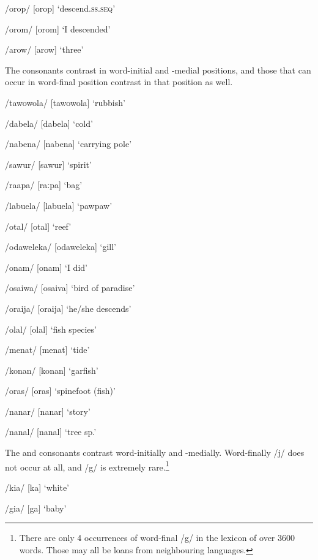 /orop/  [o{{\textprimstress}rop}]  `descend.\textsc{ss.seq}'

/orom/  [o{{\textprimstress}rom}]  `I descended'

/arow/  [a{{\textprimstress}row}]  `three'

The  consonants contrast in word-initial and -medial positions, and those that can occur in word-final position contrast in that position as well.

/tawowola/  [ta{{\textprimstress}wowola}]  `rubbish'

/dabela/  [da{{\textprimstress}bela}]  `cold'

/nabena/  [na{{\textprimstress}bena}]  `carrying pole'

/sawur/  [sa{{\textprimstress}wur}]  `spirit'    

/raapa/  [{{\textprimstress}raːpa}]  `bag'

/labuela/  [la{{\textprimstress}buela}]  `pawpaw'

/otal/  [o{{\textprimstress}tal}]  `reef'

/odaweleka/  [o{{\textprimstress}daweleka}]  `gill'

/onam/  [o{{\textprimstress}nam}]  `I did'

/osaiwa/  [o{{\textprimstress}saiva}]  `bird of paradise'

/oraija/  [o{{\textprimstress}raija}]  `he/she descends'

/olal/  [o{{\textprimstress}lal}]  `fish species'

/menat/  [me{{\textprimstress}nat}]  `tide'

/konan/  [ko{{\textprimstress}nan}]  `garfish'

/oras/  [o{{\textprimstress}ras}]  `spinefoot (fish)'

/nanar/  [na{{\textprimstress}nar}]  `story'

/nanal/  [na{{\textprimstress}nal}]  `tree sp.'

The  and  consonants contrast word-initially and -medially. Word-finally /j/ does not occur at all, and /g/ is extremely rare.\footnote{There are only 4 occurrences of word-final /g/ in the lexicon of over 3600 words. Those may all be loans from neighbouring languages.}

/kia/  [k{\textsci{{\textprimstress}}}a]  `white'

/gia/  [g{\textsci{{\textprimstress}}}a]  `baby'


